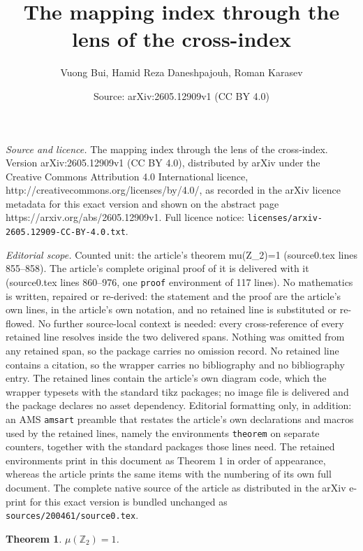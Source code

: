 \documentclass[10pt,a4paper]{amsart}
\title{The mapping index through the lens of the cross-index}
\author{Vuong Bui, Hamid Reza Daneshpajouh, Roman Karasev}
\date{Source: arXiv:2605.12909v1 (CC BY 4.0)}
\newtheorem{theorem}{Theorem}
\begin{document}
\maketitle

\noindent\emph{Source and licence.} The mapping index through the lens of the cross-index. Version arXiv:2605.12909v1 (CC BY 4.0), distributed by arXiv under the Creative Commons Attribution 4.0 International licence, http://creativecommons.org/licenses/by/4.0/, as recorded in the arXiv licence metadata for this exact version and shown on the abstract page https://arxiv.org/abs/2605.12909v1. Full licence notice: \texttt{licenses/arxiv-2605.12909-CC-BY-4.0.txt}.\par\smallskip

\noindent\textit{Editorial scope.} Counted unit: the article's theorem mu(Z\_2)=1 (source0.tex lines 855--858). The article's complete original proof of it is delivered with it (source0.tex lines 860--976, one \texttt{proof} environment of 117 lines). No mathematics is written, repaired or re-derived: the statement and the proof are the article's own lines, in the article's own notation, and no retained line is substituted or re-flowed.  No further source-local context is needed: every cross-reference of every retained line resolves inside the two delivered spans.  Nothing was omitted from any retained span, so the package carries no omission record.  No retained line contains a citation, so the wrapper carries no bibliography and no bibliography entry.  The retained lines contain the article's own diagram code, which the wrapper typesets with the standard tikz packages; no image file is delivered and the package declares no asset dependency.  Editorial formatting only, in addition: an AMS \texttt{amsart} preamble that restates the article's own declarations and macros used by the retained lines, namely the environments \texttt{theorem} on separate counters, together with the standard packages those lines need.  The retained environments print in this document as Theorem 1 in order of appearance, whereas the article prints the same items with the numbering of its own full document.  The complete native source of the article as distributed in the arXiv e-print for this exact version is bundled unchanged as \texttt{sources/200461/source0.tex}.
\begin{theorem}
\label{thm: mu(Z_2)=1}
    $\mu(\mathbb{Z}_2)=1$.
\end{theorem}
\end{document}
